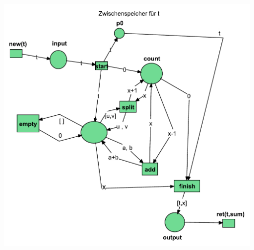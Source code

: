 \documentclass[12pt,a4paper]{article}
\begin{document}
\includegraphics[scale=0.8]{Teilaufgaben/erweitert.pdf}
%
%
%
%
%
%
\end{document}
